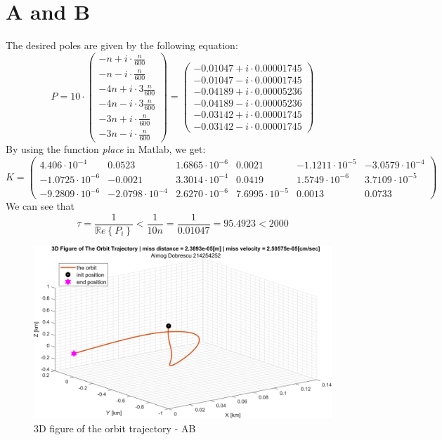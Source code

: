 \documentclass[11pt, a4paper]{article}
\begin{document}
\section{A and B}
The desired poles are given by the following equation:
\begin{equation}
    P = 10\cdot\begin{pmatrix}
        -n+i\cdot \frac{n}{600}\\-n-i\cdot \frac{n}{600}\\
        -4n+i\cdot 3\frac{n}{600}\\-4n-i\cdot 3\frac{n}{600}\\
        -3n+i\cdot \frac{n}{600}\\-3n-i\cdot \frac{n}{600}
    \end{pmatrix} = \begin{pmatrix}
        -0.01047+i\cdot0.00001745\\ -0.01047-i\cdot0.00001745\\
        -0.04189+i\cdot0.00005236\\ -0.04189-i\cdot0.00005236\\
        -0.03142+i\cdot0.00001745\\ -0.03142-i\cdot0.00001745
    \end{pmatrix}
\end{equation}
By using the function \emph{place} in Matlab, we get:
\begin{equation}
    K = \begin{pmatrix}
        4.406\cdot10^{-4}&0.0523&1.6865\cdot10^{-6}&0.0021&-1.1211\cdot10^{-5}&-3.0579\cdot10^{-4}\\
        -1.0725\cdot10^{-6}&-0.0021&3.3014\cdot10^{-4}&0.0419&1.5749\cdot10^{-6}&3.7109\cdot10^{-5}\\
        -9.2809\cdot10^{-6}&-2.0798\cdot10^{-4}&2.6270\cdot10^{-6}&7.6995\cdot10^{-5}&0.0013&0.0733
    \end{pmatrix}
\end{equation}
We can see that $$\displaystyle\tau = \frac{1}{\mathbb{R}e\left\{P_i\right\}} < \frac{1}{10n} = \frac{1}{0.01047} = 95.4923 < 2000$$
\begin{figure}[H]
    \centering
    \includegraphics[width=1\textwidth]{images/graph1.png}
    \caption{3D figure of the orbit trajectory - AB}
    \label{fig:3D-plot-AB}
\end{figure}
\end{document}
